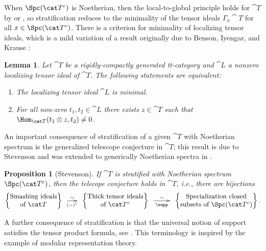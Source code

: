 \documentclass{amsart}%
\numberwithin{equation}{section}%
\newtheorem{Prop}[equation]{Proposition}
\newtheorem{Lem}[equation]{Lemma}
\theoremstyle{remark}
\newcounter{enum-resume-hack}
\begin{document}
When $\Spc(\cat T^c)$ is Noetherian, then the local-to-global principle holds for $\cat T$ by \cite[Thm.~6.9]{Stevenson13} or \cite[Thm.~3.21]{bhs1}, so stratification reduces to the minimality of the tensor ideals $\Gamma_x\cat T$ for all $x \in \Spc(\cat T^c)$. There is a criterion for minimality of localizing tensor ideals, which is a mild variation of a result originally due to Benson, Iyengar, and Krause \cite[Lem.~3.9]{BensonIyengarKrause11a}:

\begin{Lem}\label{lem:minimality_crit}
Let $\cat T$ be a rigidly-compactly generated tt-category and $\cat L$ a nonzero localizing tensor ideal of $\cat T$. The following statements are equivalent:
	\begin{enumerate}
		\item The localizing tensor ideal $\cat L$ is minimal. 
		\item For all non-zero $t_1,t_2 \in \cat L$ there exists $z \in \cat T$ such that $\Hom_{\cat T}(t_1 \otimes z,t_2) \ne 0$. 
	\end{enumerate}
\end{Lem}

An important consequence of stratification of a given $\cat T$ with Noetherian spectrum is the generalized telescope conjecture in $\cat T$; this result is due to Stevenson \cite[Thm.~7.15]{Stevenson13} and was extended to generically Noetherian spectra in \cite[Thm.~9.11]{bhs1}.

\begin{Prop}[Stevenson]\label{prop:gentelescope}
If $\cat T$ is stratified with Noetherian spectrum $\Spc(\cat T^c)$, then the telecope conjecture holds in $\cat T$, i.e., there are bijections
\[
\begin{Bmatrix}
\text{Smashing ideals} \\
\text{of } \cat T
\end{Bmatrix} 
\xymatrix@C=1.2pc{ \ar[r]_-{(-)^c}^-{\sim} &}
\begin{Bmatrix}
\text{Thick tensor ideals} \\
\text{of } \cat T^c
\end{Bmatrix} 
\xymatrix@C=2pc{ \ar[r]_-{\supp}^-{\sim} &}
\begin{Bmatrix}
\text{Specialization closed}  \\
\text{subsets of } \Spc(\cat T^c)
\end{Bmatrix}.
\]
\end{Prop}

A further consequence of stratification is that the universal notion of support satisfies the tensor product formula, see \cite[Thm.~8.2]{bhs1}. This terminology is inspired by the example of modular representation theory.
\end{document}

